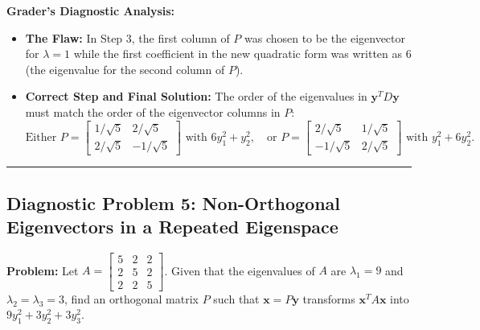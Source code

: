 \documentclass[11pt, letterpaper]{article}
\theoremstyle{definition}
\theoremstyle{remark}
\begin{document}
\textbf{Grader's Diagnostic Analysis:}
\begin{itemize}
    \item \textbf{The Flaw:} In Step 3, the first column of $P$ was chosen to be the eigenvector for $\lambda = 1$ while the first coefficient in the new quadratic form was written as $6$ (the eigenvalue for the second column of $P$).
    \item \textbf{Correct Step and Final Solution:} The order of the eigenvalues in $\mathbf{y}^T D \mathbf{y}$ must match the order of the eigenvector columns in $P$:
    \[
    \text{Either } P = \begin{bmatrix} 1/\sqrt{5} & 2/\sqrt{5} \\ 2/\sqrt{5} & -1/\sqrt{5} \end{bmatrix} \text{ with } 6y_1^2 + y_2^2, \quad \text{or } P = \begin{bmatrix} 2/\sqrt{5} & 1/\sqrt{5} \\ -1/\sqrt{5} & 2/\sqrt{5} \end{bmatrix} \text{ with } y_1^2 + 6y_2^2.
    \]
\end{itemize}

\medskip\hrule\medskip

\subsection*{Diagnostic Problem 5: Non-Orthogonal Eigenvectors in a Repeated Eigenspace}
\textbf{Problem:} Let $A = \begin{bmatrix} 5 & 2 & 2 \\ 2 & 5 & 2 \\ 2 & 2 & 5 \end{bmatrix}$. Given that the eigenvalues of $A$ are $\lambda_1 = 9$ and $\lambda_2 = \lambda_3 = 3$, find an orthogonal matrix $P$ such that $\mathbf{x} = P\mathbf{y}$ transforms $\mathbf{x}^T A \mathbf{x}$ into $9y_1^2 + 3y_2^2 + 3y_3^2$.
\end{document}
